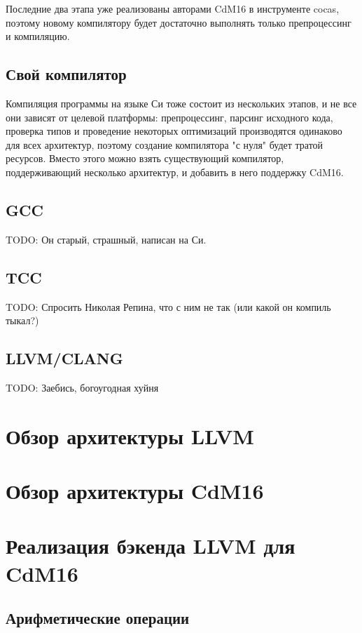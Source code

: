 \documentclass[a4paper,14pt]{extarticle}
\begin{document}
Последние два этапа уже реализованы авторами CdM16 в инструменте cocas, поэтому новому компилятору будет достаточно выполнять только препроцессинг и компиляцию. 

\subsection{Свой компилятор}

Компиляция программы на языке Си тоже состоит из нескольких этапов, и не все они зависят от целевой платформы:
препроцессинг, парсинг исходного кода, проверка типов и проведение некоторых оптимизаций производятся одинаково 
для всех архитектур, поэтому создание компилятора "с нуля" будет тратой ресурсов. 
Вместо этого можно взять существующий компилятор, поддерживающий несколько архитектур, и добавить в него
поддержку CdM16. 

\subsection{GCC}

TODO: Он старый, страшный, написан на Си.

\subsection{TCC}

TODO: Спросить Николая Репина, что с ним не так (или какой он компиль тыкал?)

\subsection{LLVM/CLANG}

TODO: Заебись, богоугодная хуйня

\pagebreak
\section{Обзор архитектуры LLVM}

\pagebreak
\section{Обзор архитектуры CdM16}

\pagebreak
\section{Реализация бэкенда LLVM для CdM16}
\subsection{Арифметические операции}
\end{document}
